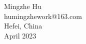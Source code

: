 \documentclass[a4paper]{article}
\begin{document}

% 
% 


\noindent
\\
\\
Mingzhe Hu\\
humingzhework@163.com\\
Hefei, China\\
April 2023
\end{document}
